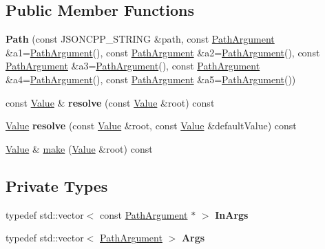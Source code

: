 \subsection*{Public Member Functions}
\begin{DoxyCompactItemize}
\item 
\mbox{\label{classJson_1_1Path_a7356c0e9c1fc2276390fd396271c1300}} 
{\bfseries Path} (const J\+S\+O\+N\+C\+P\+P\+\_\+\+S\+T\+R\+I\+NG \&path, const \hyperlink{classJson_1_1PathArgument}{Path\+Argument} \&a1=\hyperlink{classJson_1_1PathArgument}{Path\+Argument}(), const \hyperlink{classJson_1_1PathArgument}{Path\+Argument} \&a2=\hyperlink{classJson_1_1PathArgument}{Path\+Argument}(), const \hyperlink{classJson_1_1PathArgument}{Path\+Argument} \&a3=\hyperlink{classJson_1_1PathArgument}{Path\+Argument}(), const \hyperlink{classJson_1_1PathArgument}{Path\+Argument} \&a4=\hyperlink{classJson_1_1PathArgument}{Path\+Argument}(), const \hyperlink{classJson_1_1PathArgument}{Path\+Argument} \&a5=\hyperlink{classJson_1_1PathArgument}{Path\+Argument}())
\item 
\mbox{\label{classJson_1_1Path_ad1abdc54d2e03fc0e9436c3b9fd55a33}} 
const \hyperlink{classJson_1_1Value}{Value} \& {\bfseries resolve} (const \hyperlink{classJson_1_1Value}{Value} \&root) const
\item 
\mbox{\label{classJson_1_1Path_ab65ab001ccdbc6f8b5f123da58b92539}} 
\hyperlink{classJson_1_1Value}{Value} {\bfseries resolve} (const \hyperlink{classJson_1_1Value}{Value} \&root, const \hyperlink{classJson_1_1Value}{Value} \&default\+Value) const
\item 
\hyperlink{classJson_1_1Value}{Value} \& \hyperlink{classJson_1_1Path_a858f9426f0f7bbe0450644d72b44e26b}{make} (\hyperlink{classJson_1_1Value}{Value} \&root) const
\end{DoxyCompactItemize}
\subsection*{Private Types}
\begin{DoxyCompactItemize}
\item 
\mbox{\label{classJson_1_1Path_ab29d7b2fc896c7d3c5ed4609af3a3f23}} 
typedef std\+::vector$<$ const \hyperlink{classJson_1_1PathArgument}{Path\+Argument} $\ast$ $>$ {\bfseries In\+Args}
\item 
\mbox{\label{classJson_1_1Path_a27d96232d034d7a78286468676f9cb3e}} 
typedef std\+::vector$<$ \hyperlink{classJson_1_1PathArgument}{Path\+Argument} $>$ {\bfseries Args}
\end{DoxyCompactItemize}
